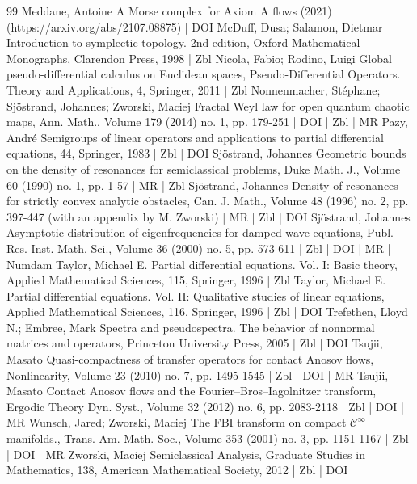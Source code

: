 \begin{thebibliography}{99}
Meddane, Antoine A Morse complex for Axiom A flows (2021) (https://arxiv.org/abs/2107.08875) | DOI
McDuff, Dusa; Salamon, Dietmar Introduction to symplectic topology. 2nd edition, Oxford Mathematical Monographs, Clarendon Press, 1998 | Zbl
Nicola, Fabio; Rodino, Luigi Global pseudo-differential calculus on Euclidean spaces, Pseudo-Differential Operators. Theory and Applications, 4, Springer, 2011 | Zbl
Nonnenmacher, Stéphane; Sjöstrand, Johannes; Zworski, Maciej Fractal Weyl law for open quantum chaotic maps, Ann. Math., Volume 179 (2014) no. 1, pp. 179-251 | DOI | Zbl | MR
Pazy, André Semigroups of linear operators and applications to partial differential equations, 44, Springer, 1983 | Zbl | DOI
Sjöstrand, Johannes Geometric bounds on the density of resonances for semiclassical problems, Duke Math. J., Volume 60 (1990) no. 1, pp. 1-57 | MR | Zbl
Sjöstrand, Johannes Density of resonances for strictly convex analytic obstacles, Can. J. Math., Volume 48 (1996) no. 2, pp. 397-447 (with an appendix by M. Zworski) | MR | Zbl | DOI
Sjöstrand, Johannes Asymptotic distribution of eigenfrequencies for damped wave equations, Publ. Res. Inst. Math. Sci., Volume 36 (2000) no. 5, pp. 573-611 | Zbl | DOI | MR | Numdam
Taylor, Michael E. Partial differential equations. Vol. I: Basic theory, Applied Mathematical Sciences, 115, Springer, 1996 | Zbl
Taylor, Michael E. Partial differential equations. Vol. II: Qualitative studies of linear equations, Applied Mathematical Sciences, 116, Springer, 1996 | Zbl | DOI
Trefethen, Lloyd N.; Embree, Mark Spectra and pseudospectra. The behavior of nonnormal matrices and operators, Princeton University Press, 2005 | Zbl | DOI
Tsujii, Masato Quasi-compactness of transfer operators for contact Anosov flows, Nonlinearity, Volume 23 (2010) no. 7, pp. 1495-1545 | Zbl | DOI | MR
Tsujii, Masato Contact Anosov flows and the Fourier–Bros–Iagolnitzer transform, Ergodic Theory Dyn. Syst., Volume 32 (2012) no. 6, pp. 2083-2118 | Zbl | DOI | MR
Wunsch, Jared; Zworski, Maciej The FBI transform on compact $\mathcal{C}^\infty $ manifolds., Trans. Am. Math. Soc., Volume 353 (2001) no. 3, pp. 1151-1167 | Zbl | DOI | MR
Zworski, Maciej Semiclassical Analysis, Graduate Studies in Mathematics, 138, American Mathematical Society, 2012 | Zbl | DOI
\end{thebibliography}
